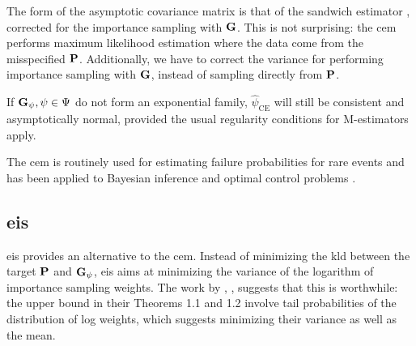 The form of the asymptotic covariance matrix is that of the sandwich estimator \citep{White1982Maximum}, corrected for the importance sampling with $\G$. This is not surprising: the \gls{cem} performs maximum likelihood estimation where the data come from the misspecified $\P$. Additionally, we have to correct the variance for performing importance sampling with $\G$, instead of sampling directly from $\P$.

If $\G_\psi, \psi \in \Psi$ do not form an exponential family, $\hat\psi_{\text{CE}}$ will still be consistent and asymptotically normal, provided the usual regularity conditions for M-estimators apply. 



The \gls{cem} is routinely used for estimating failure probabilities for rare events \citep{Homem-de-Mello2007Study} and has been applied to Bayesian inference \citep{Engel2023Bayesian,Ehre2023Certified} and optimal control problems \citep{Kappen2016Adaptive,Zhang2014Applications}.

\subsection{\texorpdfstring{\Acrfull{eis}}{Efficient importance sampling}}
\label{subsec:eis}
\gls{eis}\citep{Richard2007Efficient} provides an alternative to the \gls{cem}. Instead of minimizing the \gls{kld} between the target $\P$ and $\G_{\psi}$, \gls{eis} aims at minimizing the variance of the logarithm of importance sampling weights. 
The work by \citep{Chatterjee2018Sample} \citep{Chatterjee2018Sample}, , suggests that this is worthwhile: the upper bound in their Theorems 1.1 and 1.2 involve tail probabilities of the distribution of log weights, which suggests minimizing their variance as well as the mean.

